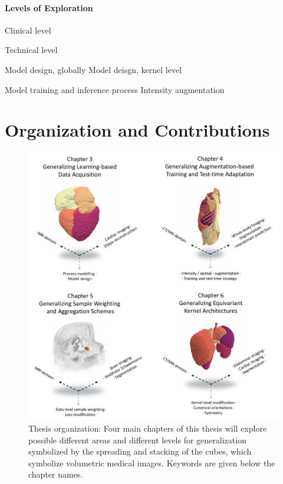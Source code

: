        \paragraph{Levels of Exploration}
            Clinical level

            Technical level

                Model design, globally
                Model deisgn, kernel level

                Model training and inference process
                Intensity augmentation

        \section{Organization and Contributions}  %
        \begin{figure}
            \label{fig:draft}
            \includegraphics[width=\textwidth]{sections/01_introduction/figures/draft_areas_levels.pdf}
            \caption{Thesis organization: Four main chapters of this thesis will explore possible different areas and different levels for generalization symbolized by the spreading and stacking of the cubes, which symbolize volumetric medical images. Keywords are given below the chapter names.}
        \end{figure}

        \noindent{}

    \noindent{}

    \noindent{}
    \noindent{}